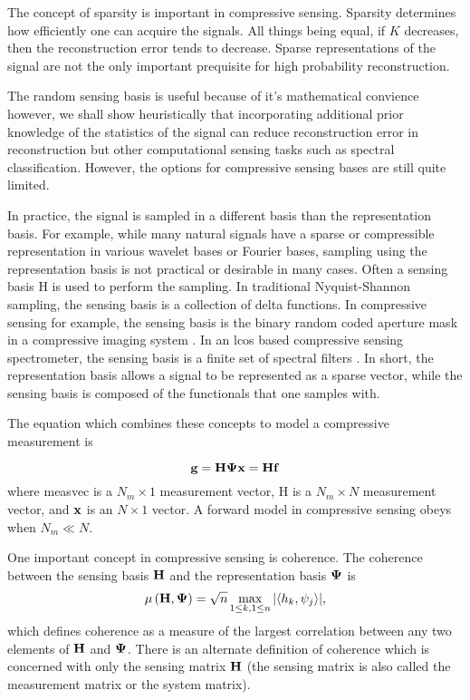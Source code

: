 The concept of \gls{sparsity} is important in compressive sensing. Sparsity determines how efficiently one can acquire the signals. All things being equal, if $K$ decreases, then the reconstruction error tends to decrease. Sparse representations of the signal are not the only important prequisite for high probability reconstruction.

The random sensing basis is useful because of it's mathematical convience however, we shall show heuristically that incorporating additional prior knowledge of the statistics of the signal can reduce reconstruction error in reconstruction but other computational sensing tasks such as spectral classification. However, the options for compressive sensing bases are still quite limited.

In practice, the signal is sampled in a different basis than the representation basis. For example, while many natural signals have a sparse or compressible representation in various wavelet bases or Fourier bases, sampling using the representation basis is not practical or desirable in many cases. Often a sensing basis \gls{H} is used to perform the sampling. In traditional Nyquist-Shannon sampling, the sensing basis is a collection of delta functions. In compressive sensing for example, the sensing basis is the binary random coded aperture mask in a compressive imaging system \cite{duarte2008single}. In an \gls{lcos} based compressive sensing spectrometer, the sensing basis is a finite set of spectral filters \cite{oiknine2016along, yuan2015compressive}. In short, the representation basis allows a signal to be represented as a sparse vector, while the sensing basis is composed of the functionals that one samples with.

The equation which combines these concepts to model a compressive measurement is

\begin{equation}
	\mathbf{g} = \mathbf{H} \mathbf{\Psi} \mathbf{x} = \mathbf{H} \mathbf{f}
	\label{eq:gHf2}
\end{equation}
where \gls{measvec} is a $N_m \times 1$ measurement vector, \gls{H} is a $N_m \times N$ measurement vector, and $\mathbf{x}$ is an $N \times 1$ vector. A forward model in compressive sensing obeys  when $N_m \ll N$. 

One important concept in \gls{compressive sensing} is coherence. The coherence between the sensing basis $\mathbf{H}$ and the representation basis $\mathbf{\Psi}$ is
\begin{equation}
	\mu \left( \mathbf{H}, \mathbf{\Psi} \right) = \sqrt{n} \max_{1 \leq k, 1 \leq n}  | \langle h_k, \psi_j \rangle | ,
	\label{eq:coherenceDef1}
\end{equation}
which defines coherence as a measure of the largest correlation between any two elements of $\mathbf{H}$ and $\mathbf{\Psi}$. There is an alternate definition of coherence which is concerned with only the sensing matrix $\mathbf{H}$ (the sensing matrix is also called the measurement matrix or the system matrix).

